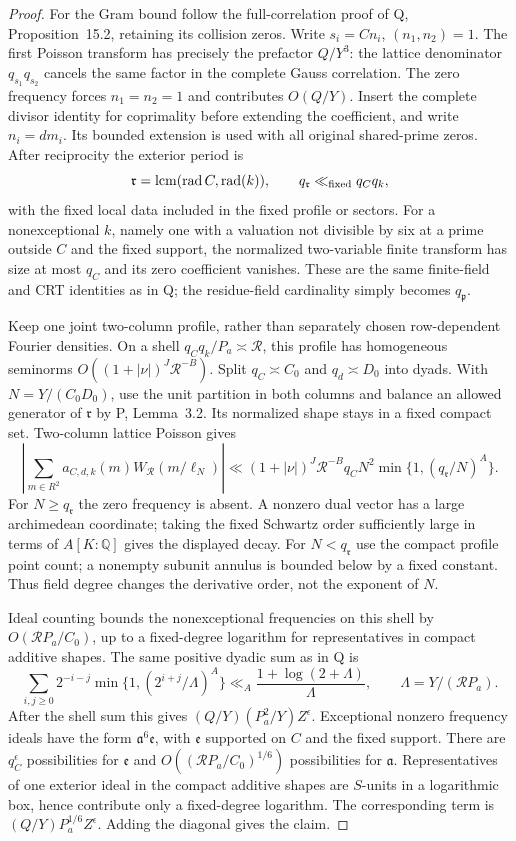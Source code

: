 \documentclass[11pt,a4paper]{article}
\theoremstyle{remark}\newtheorem{remark}[theorem]{Remark}
\numberwithin{equation}{section}
\begin{document}
\begin{proof}
For the Gram bound follow the full-correlation proof of Q,
Proposition~15.2, retaining its collision zeros. Write
$s_i=Cn_i$, $(n_1,n_2)=1$. The first Poisson transform has precisely
the prefactor $Q/Y^3$: the lattice denominator $q_{s_1}q_{s_2}$
cancels the same factor in the complete Gauss correlation.
The zero frequency forces $n_1=n_2=1$ and contributes $O(Q/Y)$.
Insert the complete divisor identity for coprimality before extending
the coefficient, and write $n_i=dm_i$. Its bounded extension is used
with all original shared-prime zeros. After reciprocity the exterior
period is
\[
 \mathfrak r=\operatorname{lcm}(\operatorname{rad} C,
                 \operatorname{rad}(k)),\qquad
 q_{\mathfrak r}\ll_{\rm fixed}q_Cq_k,
\]
with the fixed local data included in the fixed profile or sectors.
For a nonexceptional $k$, namely one with a valuation not divisible
by six at a prime outside $C$ and the fixed support, the normalized
two-variable finite transform has size at most $q_C$ and its zero
coefficient vanishes. These are the same finite-field and CRT
identities as in Q; the residue-field cardinality simply becomes
$q_{\mathfrak p}$.

Keep one joint two-column profile, rather than separately chosen
row-dependent Fourier densities. On a shell
$q_Cq_k/P_a\asymp\mathcal R$, this profile has homogeneous seminorms
$O((1+|\nu|)^J\mathcal R^{-B})$. Split $q_C\asymp C_0$ and $q_d\asymp D_0$ into dyads.
With $N=Y/(C_0D_0)$, use the unit partition in both columns and balance an
allowed generator of $\mathfrak r$ by P, Lemma~3.2. Its normalized
shape stays in a fixed compact set. Two-column lattice Poisson gives
\[
 \left|\sum_{m\in R^2}a_{C,d,k}(m)W_{\mathcal R}(m/\ell_N)\right|
 \ll (1+|\nu|)^J\mathcal R^{-B}q_CN^2
          \min\{1,(q_{\mathfrak r}/N)^A\}.
\]
For $N\ge q_{\mathfrak r}$ the zero frequency is absent. A nonzero
dual vector has a large archimedean coordinate; taking the fixed
Schwartz order sufficiently large in terms of $A[K:\mathbb Q]$
gives the displayed decay. For $N<q_{\mathfrak r}$ use the compact
profile point count; a nonempty subunit annulus is bounded below by
a fixed constant. Thus field degree changes the derivative order,
not the exponent of $N$.

Ideal counting bounds the nonexceptional frequencies on this shell
by $O(\mathcal R P_a/C_0)$, up to a fixed-degree logarithm for
representatives in compact additive shapes. The same positive dyadic
sum as in Q is
\[
 \sum_{i,j\ge0}2^{-i-j}
       \min\{1,(2^{i+j}/\Lambda)^A\}
 \ll_A\frac{1+\log(2+\Lambda)}{\Lambda},
 \qquad\Lambda=Y/(\mathcal R P_a).
\]
After the shell sum this gives $(Q/Y)(P_a^2/Y)Z^\epsilon$.
Exceptional nonzero frequency ideals have the form
$\mathfrak a^6\mathfrak e$, with $\mathfrak e$ supported on $C$
and the fixed support. There are $q_C^\epsilon$ possibilities for
$\mathfrak e$ and $O((\mathcal R P_a/C_0)^{1/6})$ possibilities
for $\mathfrak a$. Representatives of one exterior ideal in the
compact additive shapes are $S$-units in a logarithmic box, hence
contribute only a fixed-degree logarithm. The corresponding term
is $(Q/Y)P_a^{1/6}Z^\epsilon$. Adding the diagonal gives the claim.
\end{proof}
\end{document}

